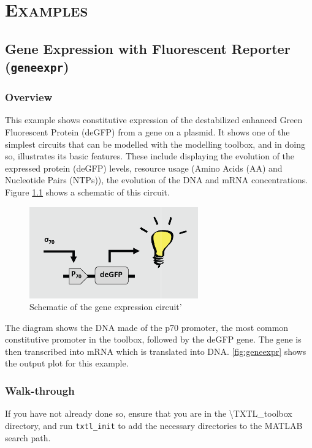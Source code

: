 \documentclass[english]{report}
\begin{document}
					
\chapter{\textsc{Examples}}
	\section{Gene Expression with Fluorescent Reporter (\texttt{geneexpr})}
		\subsection{Overview}
		This example shows constitutive expression of the destabilized enhanced Green Fluorescent Protein (deGFP) from a gene on a plasmid. It shows one of the simplest circuits that can be modelled with the modelling toolbox, and in doing so, illustrates its basic features. These include displaying the evolution of the expressed protein (deGFP) levels, resource usage (Amino Acids (AA) and Nucleotide Pairs (NTPs)), the evolution of the DNA and mRNA concentrations. Figure \ref{fig:geneexpr schematic} shows a schematic of this circuit. \\
		
		\begin{figure}
		\begin{center}
		\includegraphics{geneExpr schematic.png} 
		\caption{Schematic of the gene expression circuit'}
		\label{fig:geneexpr schematic}
		\end{center}
		\end{figure}		
		 
		The diagram shows the DNA made of the p70 promoter, the most common constitutive promoter in the toolbox, followed by the deGFP gene. The gene is then transcribed into mRNA which is translated into DNA. 
		\ref{fig:geneexpr} shows the output plot for this example. 
		
		
		
		\subsection{Walk-through}
		If you have not already done so, ensure that you are in the \textsf{\textbackslash TXTL\_toolbox} directory, and run \texttt{txtl\_init} to add the necessary directories to the MATLAB search path. 
			
\end{document}
